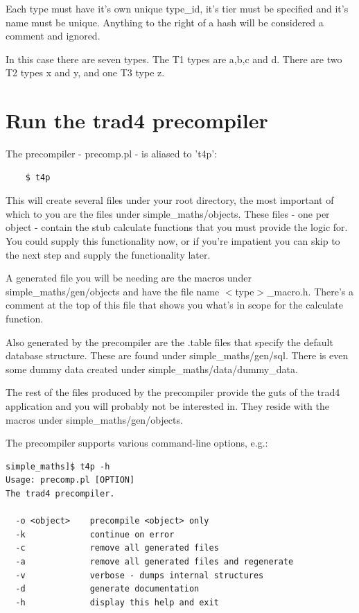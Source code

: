\documentclass{report}
\begin{document}
Each type must have it's own unique type_id, it's tier must be specified and it's name must be unique. 
Anything to the right of a hash will be considered a comment and ignored.

In this case there are seven types. The T1 types are a,b,c and d. There are two T2 types x and y, and one T3 type z.

\section{Run the trad4 precompiler}

The precompiler - precomp.pl - is aliased to 't4p':

\begin{verbatim}
    $ t4p
\end{verbatim}

This will create several files under your root directory, the most important of which to you are the files under simple_maths/objects. These files - one per object - contain the stub calculate functions that you must provide the logic for.  You could supply this functionality now, or if you're impatient you can skip to the next step and supply the functionality later.

A generated file you will be needing are the macros under simple_maths/gen/objects and have the file name $<$type$>$_macro.h. There's a comment at the top of this file that shows you what's in scope for the calculate function.

Also generated by the precompiler are the .table files that specify the default database structure. These are found under simple_maths/gen/sql. There is even some dummy data created under simple_maths/data/dummy_data.

The rest of the files produced by the precompiler provide the guts of the trad4 application and you will probably not be interested in. They reside with the macros under simple_maths/gen/objects.

The precompiler supports various command-line options, e.g.:

\begin{verbatim}
simple_maths]$ t4p -h
Usage: precomp.pl [OPTION]
The trad4 precompiler.

  -o <object>    precompile <object> only
  -k             continue on error
  -c             remove all generated files
  -a             remove all generated files and regenerate
  -v             verbose - dumps internal structures
  -d             generate documentation
  -h             display this help and exit
\end{verbatim}
\end{document}
